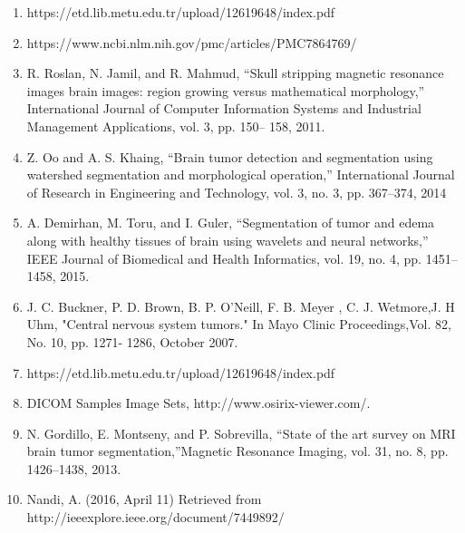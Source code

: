 \documentclass[oneside,a4paper,12pt]{book}
\begin{document}
\begin{enumerate}
    \item https://etd.lib.metu.edu.tr/upload/12619648/index.pdf
\par
    
    \item https://www.ncbi.nlm.nih.gov/pmc/articles/PMC7864769/
\par
 \item 	R. Roslan, N. Jamil, and R. Mahmud, “Skull stripping magnetic resonance images brain images: region growing versus mathematical morphology,” International Journal of Computer Information Systems and Industrial Management Applications, vol. 3, pp. 150– 158, 2011.
\par
 \item  Z. Oo and A. S. Khaing, “Brain tumor detection and segmentation using
watershed segmentation and morphological operation,” International Journal
of Research in Engineering and Technology, vol. 3, no. 3, pp. 367–374, 2014
\par
 \item A. Demirhan, M. Toru, and I. Guler, “Segmentation of tumor  and edema along with healthy tissues of brain using wavelets and neural networks,” IEEE Journal of Biomedical and Health Informatics, vol. 19, no. 4, pp. 1451–1458, 2015.
\par
 \item 	J. C. Buckner, P. D. Brown, B. P. O’Neill, F. B. Meyer , C. J. Wetmore,J. H Uhm, "Central nervous system tumors." In Mayo Clinic Proceedings,Vol. 82, No. 10, pp. 1271- 1286, October 2007.
\par
 \item https://etd.lib.metu.edu.tr/upload/12619648/index.pdf
\par
 \item 	DICOM Samples Image Sets, http://www.osirix-viewer.com/.
\par
 \item N. Gordillo, E. Montseny, and P. Sobrevilla, “State of the art survey on MRI brain tumor segmentation,”Magnetic Resonance Imaging, vol. 31, no. 8, pp. 1426–1438, 2013.
\par
 \item 	Nandi, A. (2016, April 11) Retrieved from http://ieeexplore.ieee.org/document/7449892/
\par
\end{enumerate}\par


\vspace{\baselineskip}
\setlength{\parskip}{9.96pt}

\printbibliography
\end{document}
